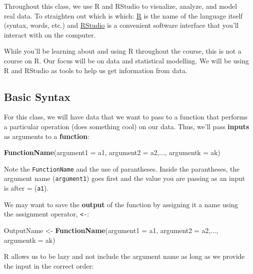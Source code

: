 \documentclass[
]{book}
\newenvironment{Shaded}{\begin{snugshade}}{\end{snugshade}}
\newcommand{\AttributeTok}[1]{\textcolor[rgb]{0.13,0.29,0.53}{#1}}
\newcommand{\FunctionTok}[1]{\textcolor[rgb]{0.13,0.29,0.53}{\textbf{#1}}}
\newcommand{\NormalTok}[1]{#1}
\newcommand{\OtherTok}[1]{\textcolor[rgb]{0.56,0.35,0.01}{#1}}
\begin{document}
Throughout this class, we use R and RStudio to visualize, analyze, and model real data. To straighten out which is which: \href{https://cran.r-project.org/}{R} is the name of the language itself (syntax, words, etc.) and \href{https://www.rstudio.com/}{RStudio} is a convenient software interface that you'll interact with on the computer.

While you'll be learning about and using R throughout the course, this is not a course on R. Our focus will be on data and statistical modelling. We will be using R and RStudio as tools to help us get information from data.

\subsection{Basic Syntax}\label{basic-syntax}

For this class, we will have data that we want to pass to a function that performs a particular operation (does something cool) on our data. Thus, we'll pass \textbf{inputs} as arguments to a \textbf{function}:

\begin{Shaded}
\begin{Highlighting}[]
\FunctionTok{FunctionName}\NormalTok{(}\AttributeTok{argument1 =}\NormalTok{ a1, }\AttributeTok{argument2 =}\NormalTok{ a2,..., }\AttributeTok{argumentk =}\NormalTok{ ak)}
\end{Highlighting}
\end{Shaded}

Note the \texttt{FunctionName} and the use of parantheses. Inside the parantheses, the argument name (\texttt{argument1}) goes first and the value you are passing as an input is after = (\texttt{a1}).

We may want to save the \textbf{output} of the function by assigning it a name using the assignment operator, \texttt{\textless{}-}:

\begin{Shaded}
\begin{Highlighting}[]
\NormalTok{OutputName }\OtherTok{\textless{}{-}} \FunctionTok{FunctionName}\NormalTok{(}\AttributeTok{argument1 =}\NormalTok{ a1, }\AttributeTok{argument2 =}\NormalTok{ a2,..., }\AttributeTok{argumentk =}\NormalTok{ ak)}
\end{Highlighting}
\end{Shaded}

R allows us to be lazy and not include the argument name as long as we provide the input in the correct order:
\end{document}
